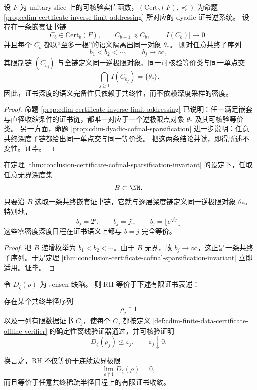 \begin{theorem}[证书链的共终稀疏化不改变逆极限对象]\label{thm:conclusion-certificate-cofinal-sparsification-invariant}
设 \(F\) 为 unitary slice 上的可核验实值函数，\((\mathrm{Cert}_b(F),\preceq)\) 为命题 \ref{prop:cdim-certificate-inverse-limit-addressing} 所对应的 dyadic 证书逆系统。
设存在一条嵌套证书链
\[
C_b\in \mathrm{Cert}_b(F),
\qquad
C_{b+1}\preceq C_b,
\qquad
|I(C_b)|\to 0,
\]
并且每个 \(C_b\) 都以“至多一根”的语义隔离出同一对象 \(\theta_\ast\)。
则对任意共终子序列
\[
b_1<b_2<\cdots,
\qquad
b_j\to\infty,
\]
其限制链 \((C_{b_j})\) 与全链定义同一逆极限对象、同一可核验等价类与同一单点交
\[
\bigcap_{j\ge 1} I(C_{b_j})=\{\theta_\ast\}.
\]
因此，证书深度的语义完备性只依赖于共终性，而不依赖深度采样的密度。
\end{theorem}

\begin{proof}
命题 \ref{prop:cdim-certificate-inverse-limit-addressing} 已说明：任一满足嵌套与直径收缩条件的证书链，都唯一对应于一个逆极限点对象 \(\theta_\ast\) 及其可核验等价类。
另一方面，命题 \ref{prop:cdim-dyadic-cofinal-sparsification} 进一步说明：任意共终深度子链都给出同一单点交与同一等价类。
把这两条结论并读，即得所述不变性。证毕。
\end{proof}

\begin{corollary}[零密度深度档案仍然证书完备]\label{cor:conclusion-zero-density-depth-archive-still-complete}
在定理 \ref{thm:conclusion-certificate-cofinal-sparsification-invariant} 的设定下，任取任意无界深度集
\[
B\subset \NN.
\]
只要沿 \(B\) 选取一条共终嵌套证书链，它就与逐层深度链定义同一逆极限对象 \(\theta_\ast\)。
特别地，
\[
b_j=2^j,
\qquad
b_j=j!,
\qquad
b_j=\lfloor e^{\sqrt j}\rfloor
\]
这些零密度深度日程在证书语义上都与 \(b=j\) 完全等价。
\end{corollary}

\begin{proof}
把 \(B\) 递增枚举为 \(b_1<b_2<\cdots\)。由于 \(B\) 无界，故 \(b_j\to\infty\)，这正是一条共终子序列。于是定理 \ref{thm:conclusion-certificate-cofinal-sparsification-invariant} 立即适用。证毕。
\end{proof}

\begin{theorem}[RH 的共终稀疏证书等价表述]\label{thm:conclusion-rh-cofinal-sparse-certificate-equivalence}
令 \(D_\zeta(\rho)\) 为 Jensen 缺陷。
则 RH 等价于下述有限证书表述：

\smallskip
\noindent
存在某个共终半径序列
\[
\rho_j\uparrow 1
\]
以及一列有限数据证书 \(C_j\)，使每个 \(C_j\) 都按定义 \ref{def:cdim-finite-data-certificate-offline-verifier} 的确定性离线验证器通过，并可核验证明
\[
D_\zeta(\rho_j)\le \varepsilon_j,
\qquad
\varepsilon_j\downarrow 0.
\]
\smallskip

换言之，RH 不仅等价于连续边界极限
\[
\lim_{\rho\uparrow 1}D_\zeta(\rho)=0,
\]
而且等价于任意共终稀疏半径日程上的有限证书收敛。
\end{theorem}

